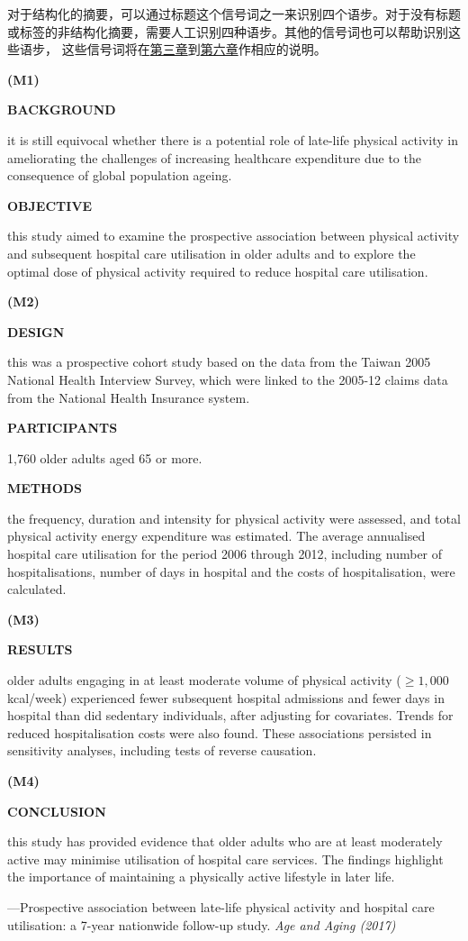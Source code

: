 \documentclass[a4paper]{ctexbook}
\begin{document}
对于结构化的摘要，可以通过标题这个信号词之一来识别四个语步。对于没有标题或标签的非结构化摘要，需要人工识别四种语步。其他的信号词也可以帮助识别这些语步， 这些信号词将在\hyperref[chapter3]{第三章}到\hyperref[chapter6]{第六章}作相应的说明。

\begin{sample}[label={myautocounter}]{\heiti}

\textbf{(M1)}

\textbf{BACKGROUND }

it is still equivocal whether there is a potential role of late-life physical activity in ameliorating the challenges of increasing healthcare expenditure due to the consequence of global population ageing.

\textbf{OBJECTIVE} 

this study aimed to examine the prospective association between physical activity and subsequent hospital care utilisation in older adults and to explore the optimal dose of physical activity required to reduce hospital care utilisation.

\textbf{(M2)}

\textbf{DESIGN} 

this was a prospective cohort study based on the data from the Taiwan 2005 National Health Interview Survey, which were linked to the 2005-12 claims data from the National Health Insurance system.

\textbf{PARTICIPANTS}

1,760 older adults aged 65 or more.

\textbf{METHODS} 

the frequency, duration and intensity for physical activity were assessed, and total physical activity energy expenditure was estimated. The average annualised hospital care utilisation for the period 2006 through 2012, including number of hospitalisations, number of days in hospital and the costs of hospitalisation, were calculated.

\textbf{(M3)}

\textbf{RESULTS }

older adults engaging in at least moderate volume of physical activity ($\geqslant 1,000$ kcal/week) experienced fewer subsequent hospital admissions and fewer days in hospital than did sedentary individuals, after adjusting for covariates. Trends for reduced hospitalisation costs were also found. These associations persisted in sensitivity analyses, including tests of reverse causation.

\textbf{(M4)}

\textbf{CONCLUSION}

this study has provided evidence that older adults who are at least moderately active may minimise utilisation of hospital care services. The findings highlight the importance of maintaining a physically active lifestyle in later life.

\begin{flushright}
  ---Prospective association between late-life physical activity and hospital care utilisation: a 7-year nationwide follow-up study. \emph{Age and Aging (2017)}
\end{flushright}

\end{sample}
\end{document}
